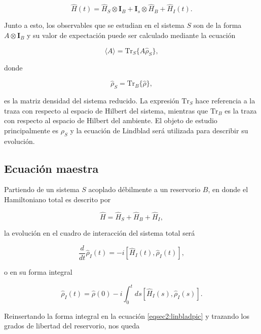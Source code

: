 \begin{equation*}
    \hat{H}(t) = \hat{H}_{S} \otimes \mathbf{I}_{B} + \mathbf{I}_{s} \otimes \hat{H}_{B} + \hat{H}_{I}(t).
\end{equation*}

Junto a esto,  los observables que se estudian en el sistema $S$ son de la forma $A\otimes \mathbf{I}_{B}$ y su valor de expectación puede ser calculado mediante la ecuación

\begin{equation*}
    \langle A \rangle = \text{Tr}_{S}\{A \hat{\rho}_{S} \},
\end{equation*}

donde 

\begin{equation*}
    \hat{\rho}_{S} = \text{Tr}_{B}\{ \hat{\rho} \},
\end{equation*}

es la matriz densidad del sistema reducido. La expresión $\text{Tr}_{S}$ hace referencia a la traza con respecto al espacio de Hilbert del sistema, mientras que $\text{Tr}_{B}$  
es la traza con respecto al espacio de Hilbert del ambiente. El objeto de estudio principalmente es $\rho_{S}$ y la ecuación de Lindblad será utilizada para describir su evolución.

\subsection{Ecuación maestra}
Partiendo de un sistema $S$ acoplado débilmente a un reservorio $B$, en donde el Hamiltoniano total es descrito por 

\begin{equation*}
    \hat{H} = \hat{H}_{S} + \hat{H}_{B} + \hat{H}_{I},
\end{equation*}

la evolución en el cuadro de interacción del sistema total será

\begin{equation}
    \frac{d}{dt}\hat{\rho}_{I}(t) = -i[\hat{H}_{I}(t), \hat{\rho}_{I}(t)],
    \label{eqsec2:linbladpic}
\end{equation}

o en su forma integral

\begin{equation*}
    \hat{\rho}_{I}(t) = \hat{\rho}(0) - i \int_{0}^{t} ds[\hat{H}_{I}(s), \hat{\rho}_{I}(s)].
\end{equation*}

Reinsertando la forma integral en la ecuación \ref{eqsec2:linbladpic} y trazando los grados de libertad del reservorio, nos queda

